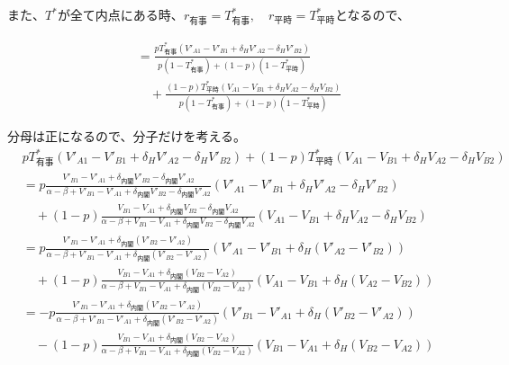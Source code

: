 \documentclass[main.tex]{subfiles}
\begin{document}
また、$T^*$が全て内点にある時、$r_{有事}=T^*_{有事}, \quad r_{平時} = T^*_{平時}$となるので、

\begin{align*}
    &= \frac{  pT^*_{有事}(V'_{A1} -V'_{B1} + \delta_H V'_{A2} - \delta_H V'_{B2})  }{ p(1-T^*_{有事}) +(1-p)(1-T^*_{平時})  }\\[1em]
    &\quad + \frac{ (1-p)T^*_{平時}(V_{A1} - V_{B1} + \delta_H V_{A2} - \delta_H V_{B2} ) }{ p(1-T^*_{有事}) + (1-p)(1-T^*_{平時})  }
\end{align*}

分母は正になるので、分子だけを考える。
\begin{align*}
    &pT^*_{有事}(V'_{A1} -V'_{B1} + \delta_H V'_{A2} - \delta_H V'_{B2}) + (1-p)T^*_{平時}(V_{A1} - V_{B1} + \delta_H V_{A2} - \delta_H V_{B2})\\[1em]
    &= p \frac{ V'_{B1} - V'_{A1} +\delta_{内閣}V'_{B2} - \delta_{内閣}V'_{A2} }{ \alpha-\beta + V'_{B1}-V'_{A1} + \delta_{内閣}V'_{B2} - \delta_{内閣}V'_{A2} } (V'_{A1} -V'_{B1} + \delta_H V'_{A2} - \delta_H V'_{B2})\\[1em]
    &\quad + (1-p) \frac{ V_{B1} - V_{A1} +\delta_{内閣}V_{B2} - \delta_{内閣}V_{A2} }{ \alpha-\beta + V_{B1}-V_{A1} + \delta_{内閣}V_{B2} - \delta_{内閣}V_{A2} }(V_{A1} - V_{B1} + \delta_H V_{A2} - \delta_H V_{B2})\\[1em]
    &= p \frac{ V'_{B1} - V'_{A1} +\delta_{内閣}(V'_{B2} - V'_{A2}) }{ \alpha-\beta + V'_{B1}-V'_{A1} + \delta_{内閣}(V'_{B2} - V'_{A2}) } (V'_{A1} -V'_{B1} + \delta_H (V'_{A2} - V'_{B2}))\\[1em]
    &\quad + (1-p) \frac{ V_{B1} - V_{A1} +\delta_{内閣}(V_{B2} - V_{A2}) }{ \alpha-\beta + V_{B1}-V_{A1} + \delta_{内閣}(V_{B2} - V_{A2}) }(V_{A1} - V_{B1} + \delta_H (V_{A2} - V_{B2}))\\[1em]
    &= -p \frac{ V'_{B1} - V'_{A1} +\delta_{内閣}(V'_{B2} - V'_{A2}) }{ \alpha-\beta + V'_{B1}-V'_{A1} + \delta_{内閣}(V'_{B2} - V'_{A2}) } (V'_{B1} -V'_{A1} + \delta_H (V'_{B2} - V'_{A2}))\\[1em]
    &\quad - (1-p) \frac{ V_{B1} - V_{A1} +\delta_{内閣}(V_{B2} - V_{A2}) }{ \alpha-\beta + V_{B1}-V_{A1} + \delta_{内閣}(V_{B2} - V_{A2}) }(V_{B1} - V_{A1} + \delta_H (V_{B2} - V_{A2}))\\[1em]
\end{align*}
\end{document}
